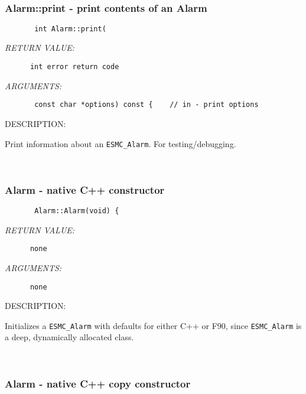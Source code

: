 \mbox{}\hrulefill\ 
 
\subsubsection [Alarm::print] {Alarm::print - print contents of an Alarm}


  
\begin{verbatim}       int Alarm::print(\end{verbatim}{\em RETURN VALUE:}
\begin{verbatim}      int error return code\end{verbatim}{\em ARGUMENTS:}
\begin{verbatim}       const char *options) const {    // in - print options\end{verbatim}
{\sf DESCRIPTION:\\ }


        Print information about an {\tt ESMC\_Alarm}.  For testing/debugging.
   
 
\mbox{}\hrulefill\ 
 
\subsubsection [Alarm] {Alarm - native C++ constructor}


  
\begin{verbatim}       Alarm::Alarm(void) {\end{verbatim}{\em RETURN VALUE:}
\begin{verbatim}      none\end{verbatim}{\em ARGUMENTS:}
\begin{verbatim}      none\end{verbatim}
{\sf DESCRIPTION:\\ }


        Initializes a {\tt ESMC\_Alarm} with defaults for either
        C++ or F90, since {\tt ESMC\_Alarm} is a deep, dynamically
        allocated class.
   
 
\mbox{}\hrulefill\ 
 
\subsubsection [Alarm] {Alarm - native C++ copy constructor}



